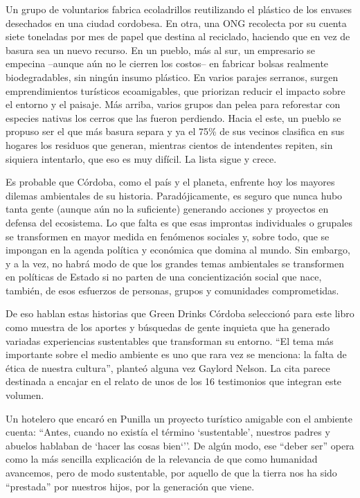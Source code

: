 \documentclass[
]{article}
\begin{document}
Un grupo de voluntarios fabrica ecoladrillos reutilizando el plástico de
los envases desechados en una ciudad cordobesa. En otra, una ONG
recolecta por su cuenta siete toneladas por mes de papel que destina al
reciclado, haciendo que en vez de basura sea un nuevo recurso. En un
pueblo, más al sur, un empresario se empecina --aunque aún no le cierren
los costos-- en fabricar bolsas realmente biodegradables, sin ningún
insumo plástico. En varios parajes serranos, surgen emprendimientos
turísticos ecoamigables, que priorizan reducir el impacto sobre el
entorno y el paisaje. Más arriba, varios grupos dan pelea para
reforestar con especies nativas los cerros que las fueron perdiendo.
Hacia el este, un pueblo se propuso ser el que más basura separa y ya el
75\% de sus vecinos clasifica en sus hogares los residuos que generan,
mientras cientos de intendentes repiten, sin siquiera intentarlo, que
eso es muy difícil. La lista sigue y crece.

Es probable que Córdoba, como el país y el planeta, enfrente hoy los
mayores dilemas ambientales de su historia. Paradójicamente, es seguro
que nunca hubo tanta gente (aunque aún no la suficiente) generando
acciones y proyectos en defensa del ecosistema. Lo que falta es que esas
improntas individuales o grupales se transformen en mayor medida en
fenómenos sociales y, sobre todo, que se impongan en la agenda política
y económica que domina al mundo. Sin embargo, y a la vez, no habrá modo
de que los grandes temas ambientales se transformen en políticas de
Estado si no parten de una concientización social que nace, también, de
esos esfuerzos de personas, grupos y comunidades comprometidas.

De eso hablan estas historias que Green Drinks Córdoba seleccionó para
este libro como muestra de los aportes y búsquedas de gente inquieta que
ha generado variadas experiencias sustentables que transforman su
entorno. ``El tema más importante sobre el medio ambiente es uno que
rara vez se menciona: la falta de ética de nuestra cultura'', planteó
alguna vez Gaylord Nelson. La cita parece destinada a encajar en el
relato de unos de los 16 testimonios que integran este volumen.

Un hotelero que encaró en Punilla un proyecto turístico amigable con el
ambiente cuenta: ``Antes, cuando no existía el término `sustentable',
nuestros padres y abuelos hablaban de `hacer las cosas bien`''. De algún
modo, ese ``deber ser'' opera como la más sencilla explicación de la
relevancia de que como humanidad avancemos, pero de modo sustentable,
por aquello de que la tierra nos ha sido ``prestada'' por nuestros
hijos, por la generación que viene.
\end{document}
